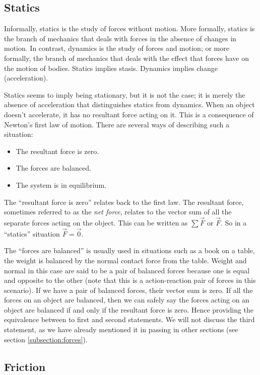 \subsection{Statics}

Informally, statics is the study of forces without motion. More formally, statics is the branch of mechanics that deals with forces in the absence of changes in motion. In contrast, dynamics is the study of forces and motion; or more formally, the branch of mechanics that deals with the effect that forces have on the motion of bodies. Statics implies stasis. Dynamics implies change (acceleration). 

Statics seems to imply being stationary, but it is not the case; it is merely the absence of acceleration that distinguishes statics from dynamics. When an object doesn't accelerate, it has no resultant force acting on it. This is a consequence of Newton's first law of motion. There are several ways of describing such a situation:
\begin{itemize}
    \item The resultant force is zero.
    \item The forces are balanced.
    \item The system is in equilibrium.
\end{itemize}
The ``resultant force is zero'' relates back to the first law. The resultant force, sometimes referred to as the \textit{net force}, relates to the vector sum of all the separate forces acting on the object. This can be written as $\sum \vec{F}$ or $\vec{F}$. So in a ``statics'' situation $\vec{F} = \vec{0}$.

The ``forces are balanced'' is usually used in situations such as a book on a table, the weight is balanced by the normal contact force from the table. Weight and normal in this case are said to be a pair of balanced forces because one is equal and opposite to the other (note that this is a action-reaction pair of forces in this scenario). If we have a pair of balanced forces, their vector sum is zero. If all the forces on an object are balanced, then we can safely say the forces acting on an object are balanced if and only if the resultant force is zero. Hence providing the equivalence between to first and second statements. We will not discuss the third statement, as we have already mentioned it in passing in other sections (see section \ref{subsection:forces}).  


\subsection{Friction}

